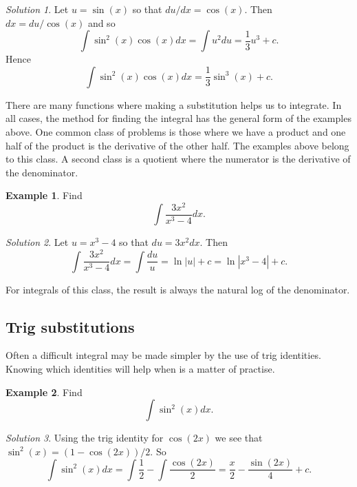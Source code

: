 \documentclass[
  11pt,
  oneside]{book}
\newcommand{\slide}{}
\newcommand{\cpybx}{}
\newcommand{\ecpybx}{}
\theoremstyle{definition}
\theoremstyle{definition}
\newtheorem{example}{Example}[chapter]
\theoremstyle{definition}
\theoremstyle{definition}
\theoremstyle{remark}
\newtheorem*{solution}{Solution}
\begin{document}
\ecpybx\slide\copy\copybox

\begin{solution}
Let \(u = \sin(x)\) so that \(du/dx = \cos(x)\). Then \(dx = du/\cos(x)\) and so
\[
\int\sin^2(x)\cos(x)dx = \int u^2du = \frac 13u^3+c.
\]
Hence
\[
\int\sin^2(x)\cos(x)dx = \frac 13\sin^3(x) + c.
\]
\end{solution}

\slide

There are many functions where making a substitution helps us to integrate. In all cases, the method for finding the integral has the general form of the examples above. One common class of problems is those where we have a product and one half of the product is the derivative of the other half. The examples above belong to this class. A second class is a quotient where the numerator is the derivative of the denominator.

\cpybx

\begin{example}
Find
\[
\int\frac{3x^2}{x^3-4}dx.
\]
\end{example}

\ecpybx\slide\copy\copybox

\begin{solution}
Let \(u = x^3-4\) so that \(du = 3x^2dx\). Then
\[
\int\frac{3x^2}{x^3-4}dx = \int \frac{du}{u} = \ln|u|+c = \ln|x^3-4|+c.
\]
\end{solution}

For integrals of this class, the result is always the natural log of the denominator.
\slide

\subsection{Trig substitutions}\label{trig-substitutions}

Often a difficult integral may be made simpler by the use of trig identities. Knowing which identities will help when is a matter of practise.

\begin{example}
Find
\[
\int\sin^2(x) dx.
\]
\end{example}

\begin{solution}
Using the trig identity for \(\cos(2x)\) we see that \(\sin^2(x) = (1-\cos(2x))/2\). So
\[
\int\sin^2(x) dx = \int\frac 12-\int\frac{\cos(2x)}{2} = \frac x2-\frac{\sin(2x)}{4}+c.
\]
\end{solution}
\end{document}
